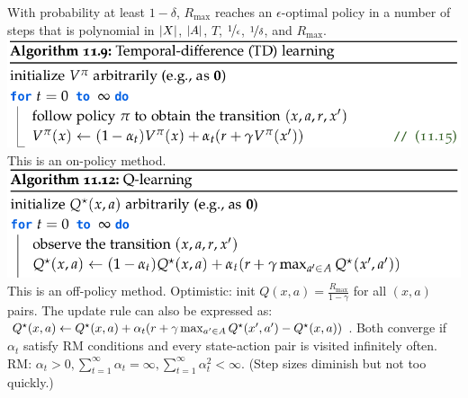 With probability at least $1-\delta$, $R_\mathrm{max}$ reaches an $\epsilon$-optimal policy in a number of steps that is polynomial in $\left| X \right|$, $\left| A \right|$, $T$, $\nicefrac{1}{\epsilon}$, $\nicefrac{1}{\delta}$, and $R_\mathrm{max}$.
\includegraphics[width=0.95\linewidth,trim={0 0 4cm 0}]{images/TD_learning.png}
This is an on-policy method.
\includegraphics[width=0.95\linewidth, trim={0 0 3cm 0}]{images/Q_learning.png}
This is an off-policy method.
Optimistic: init $Q(x,a) = \frac{R_{\max}}{1-\gamma}$ for all $(x,a)$ pairs.
The update rule can also be expressed as: $\Q*{x}{a} \gets \Q*{x}{a} + \alpha_t\parentheses*{r + \gamma \max_{a' \in \sA} \Q*{x'}{a'} - \Q*{x}{a}}$.
Both converge if $\alpha_t$ satisfy RM conditions and every state-action pair is visited infinitely often.
RM: \(\alpha_t > 0, \sum_{t=1}^\infty \alpha_t = \infty, \sum_{t=1}^\infty \alpha_t^2 < \infty\). (Step sizes diminish but not too quickly.)

